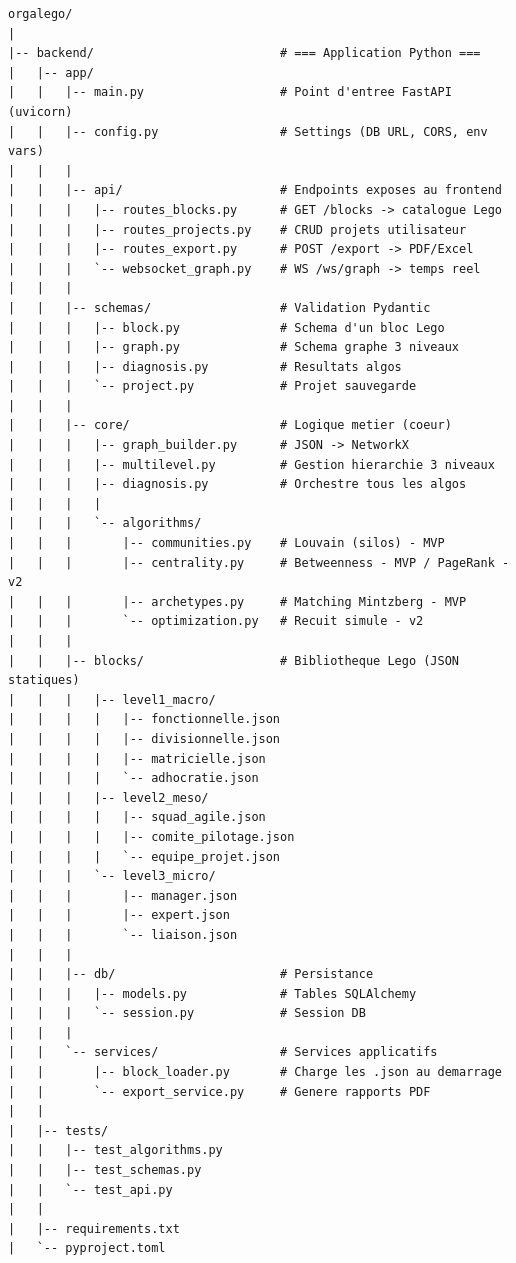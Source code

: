 \documentclass[11pt,a4paper]{article}
\begin{document}
\begin{lstlisting}[style=treestyle]
orgalego/
|
|-- backend/                          # === Application Python ===
|   |-- app/
|   |   |-- main.py                   # Point d'entree FastAPI (uvicorn)
|   |   |-- config.py                 # Settings (DB URL, CORS, env vars)
|   |   |
|   |   |-- api/                      # Endpoints exposes au frontend
|   |   |   |-- routes_blocks.py      # GET /blocks -> catalogue Lego
|   |   |   |-- routes_projects.py    # CRUD projets utilisateur
|   |   |   |-- routes_export.py      # POST /export -> PDF/Excel
|   |   |   `-- websocket_graph.py    # WS /ws/graph -> temps reel
|   |   |
|   |   |-- schemas/                  # Validation Pydantic
|   |   |   |-- block.py              # Schema d'un bloc Lego
|   |   |   |-- graph.py              # Schema graphe 3 niveaux
|   |   |   |-- diagnosis.py          # Resultats algos
|   |   |   `-- project.py            # Projet sauvegarde
|   |   |
|   |   |-- core/                     # Logique metier (coeur)
|   |   |   |-- graph_builder.py      # JSON -> NetworkX
|   |   |   |-- multilevel.py         # Gestion hierarchie 3 niveaux
|   |   |   |-- diagnosis.py          # Orchestre tous les algos
|   |   |   |
|   |   |   `-- algorithms/
|   |   |       |-- communities.py    # Louvain (silos) - MVP
|   |   |       |-- centrality.py     # Betweenness - MVP / PageRank - v2
|   |   |       |-- archetypes.py     # Matching Mintzberg - MVP
|   |   |       `-- optimization.py   # Recuit simule - v2
|   |   |
|   |   |-- blocks/                   # Bibliotheque Lego (JSON statiques)
|   |   |   |-- level1_macro/
|   |   |   |   |-- fonctionnelle.json
|   |   |   |   |-- divisionnelle.json
|   |   |   |   |-- matricielle.json
|   |   |   |   `-- adhocratie.json
|   |   |   |-- level2_meso/
|   |   |   |   |-- squad_agile.json
|   |   |   |   |-- comite_pilotage.json
|   |   |   |   `-- equipe_projet.json
|   |   |   `-- level3_micro/
|   |   |       |-- manager.json
|   |   |       |-- expert.json
|   |   |       `-- liaison.json
|   |   |
|   |   |-- db/                       # Persistance
|   |   |   |-- models.py             # Tables SQLAlchemy
|   |   |   `-- session.py            # Session DB
|   |   |
|   |   `-- services/                 # Services applicatifs
|   |       |-- block_loader.py       # Charge les .json au demarrage
|   |       `-- export_service.py     # Genere rapports PDF
|   |
|   |-- tests/
|   |   |-- test_algorithms.py
|   |   |-- test_schemas.py
|   |   `-- test_api.py
|   |
|   |-- requirements.txt
|   `-- pyproject.toml

\end{lstlisting}
\end{document}
